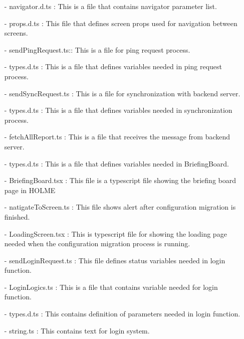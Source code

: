 \documentclass[conference]{IEEEtran}
\begin{document}
\begin{enumerate}
        \item[-] navigator.d.ts : This is a file that contains navigator parameter list.\\
        \item[-] props.d.ts : This file that defines screen props used for navigation between screens.\\
        \item[-] sendPingRequest.ts:: This is a file for ping request process.\\
        \item[-] types.d.ts : This is a file that defines variables needed in ping request process.\\
        \item[-] sendSyncRequest.ts : This is a file for synchronization with backend server.\\
        \item[-] types.d.ts : This is a file that defines variables needed in synchronization process.\\
        \item[-] fetchAllReport.ts : This is a file that receives the message from backend server.\\
        \item[-] types.d.ts  : This is a file that defines variables needed in BriefingBoard.  \\
        \item[-] BriefingBoard.tsx : This file is a typescript file showing the briefing board page in HOLME\\
        \item[-] natigateToScreen.ts : This file shows alert after configuration migration is finished.\\
        \item[-] LoadingScreen.tsx : This is typescript file for showing the loading page needed when the configuration migration process is running.\\
        \item[-] sendLoginRequest.ts  : This file defines status variables needed in login function.\\
        \item[-] LoginLogics.ts  : This is a file that contains variable needed for login function.\\
        \item[-] types.d.ts  : This contains definition of parameters needed in login function.\\
        \item[-] string.ts : This contains text for login system.\\

\end{enumerate}
\end{document}
